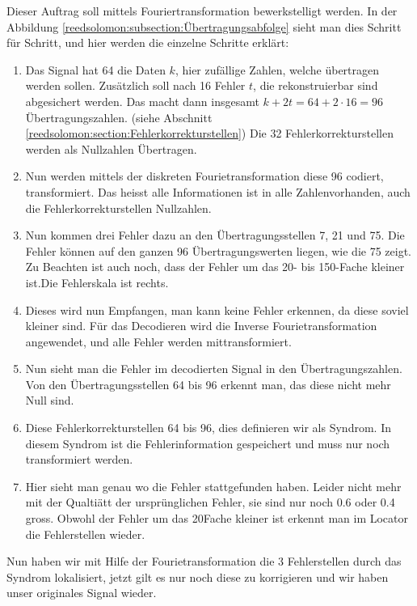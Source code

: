 Dieser Auftrag soll mittels Fouriertransformation bewerkstelligt werden.
In der Abbildung \ref{reedsolomon:subsection:Übertragungsabfolge} sieht man dies Schritt für Schritt,
und hier werden die einzelne Schritte erklärt:
\begin{enumerate}[(1)]
 \item Das Signal hat 64 die Daten $k$, hier zufällige Zahlen, welche übertragen werden sollen. 
 Zusätzlich soll nach 16 Fehler $t$, die rekonstruierbar sind abgesichert werden.
 Das macht dann insgesamt $k + 2t = 
 64 +2 \cdot 16= 96$ Übertragungszahlen.
 (siehe Abschnitt \ref{reedsolomon:section:Fehlerkorrekturstellen})
 Die 32 Fehlerkorrekturstellen werden als Nullzahlen Übertragen.
 \item Nun werden mittels der diskreten Fourietransformation diese 96 codiert, transformiert.
 Das heisst alle Informationen ist in alle Zahlenvorhanden, auch die Fehlerkorrekturstellen Nullzahlen.
 \item Nun kommen drei Fehler dazu an den Übertragungsstellen 7, 21 und 75.
 Die Fehler können auf den ganzen 96 Übertragungswerten liegen, wie die 75 zeigt.
Zu Beachten ist auch noch, dass der Fehler um das 20- bis 150-Fache kleiner ist.Die Fehlerskala ist rechts.
 \item Dieses wird nun Empfangen, man kann keine Fehler erkennen, da diese soviel kleiner sind.
 Für das Decodieren wird die Inverse Fourietransformation angewendet, und alle Fehler werden mittransformiert.
 \item Nun sieht man die Fehler im decodierten Signal in den Übertragungszahlen. 
 Von den Übertragungsstellen 64 bis 96 erkennt man, das diese nicht mehr Null sind.
 \item Diese Fehlerkorrekturstellen 64 bis 96, dies definieren wir als Syndrom.
 In diesem Syndrom ist die Fehlerinformation gespeichert und muss nur noch transformiert werden.
 \item Hier sieht man genau wo die Fehler stattgefunden haben. 
 Leider nicht mehr mit der Qualtiätt der ursprünglichen Fehler, sie sind nur noch 0.6 oder 0.4 gross.
 Obwohl der Fehler um das 20Fache kleiner ist erkennt man im Locator die Fehlerstellen wieder.
 \end{enumerate}
 Nun haben wir mit Hilfe der Fourietransformation die 3 Fehlerstellen durch das Syndrom lokalisiert, 
 jetzt gilt es nur noch diese zu korrigieren und wir haben unser originales Signal wieder.
